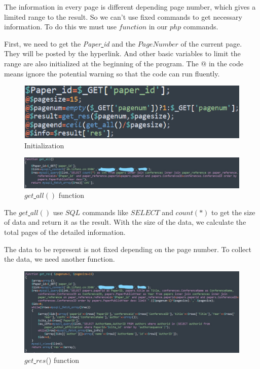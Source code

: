 \documentclass{article}
\begin{document}
	The information in every page is different depending page number, which gives a limited range to the result. So we can't use fixed commands to get necessary information. To do this we must use \(function\) in our \(php\) commands.
	\par First, we need to get the \emph{Paper\underline{ }id} and the \(Page Number\) of the current page. They will be posted by the hyperlink. And other basic variables to limit the range are also initialized at the beginning of the program. The @ in the code means ignore the potential warning so that the code can run fluently.
	\begin{figure}[H]
		\centering
		\includegraphics[width=0.6\linewidth]{p_22.png}
		\caption{Initialization}
	\end{figure}
	\begin{figure}[H]
		\centering
		\includegraphics[width=0.9\linewidth]{p_23.jpg}
		\caption{\(get\)\underline{ }\(all()\) function}
	\end{figure}
	The \(get\)\underline{ }\(all()\) use \(SQL\) commands like \(SELECT\) and \(count(*)\) to get the size of data and return it as the result. With the size of the data, we calculate the total pages of the detailed information.
	\par The data to be represent is not fixed depending on the page number. To collect the data, we need another function.
	\begin{figure}[H]
		\centering
		\includegraphics[width=0.7\linewidth]{P_24.jpg}
		\caption{\(get\)\underline{ }\(res\)() function}
	\end{figure}
\end{document}
